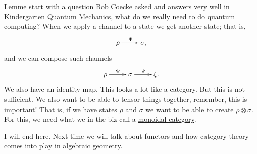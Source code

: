 \documentclass[english,12pt]{article}
\theoremstyle{definition}
\begin{document}
Lemme start with a question Bob Coecke asked and answers very well in \href{https://arxiv.org/abs/quant-ph/0510032}{Kindergarten Quantum
Mechanics}, what do we really need to do quantum computing? When we apply a
channel to a state we get another state; that is,
\begin{equation}
  \xymatrix{
    \rho \ar[r]^\Phi & \sigma,
  }
\end{equation}
and we can compose such channels
\begin{equation}
  \xymatrix{
    \rho \ar[r]^\Phi & \sigma \ar[r]^\Psi & \xi.
  }
\end{equation}
We also have an identity map. This looks a lot like a category. But this is
not sufficient. We also want to be able to tensor things together,
remember, this is important! That is, if we have states $\rho$ and $\sigma$
we want to be able to create $\rho \otimes \sigma$. For this, we need what
we in the biz call a
\href{https://ncatlab.org/nlab/show/monoidal+category}{monoidal category}.

\vspace{4mm}
I will end here. Next time we will talk about functors and how category
theory comes into play in algebraic geometry.
\end{document}
